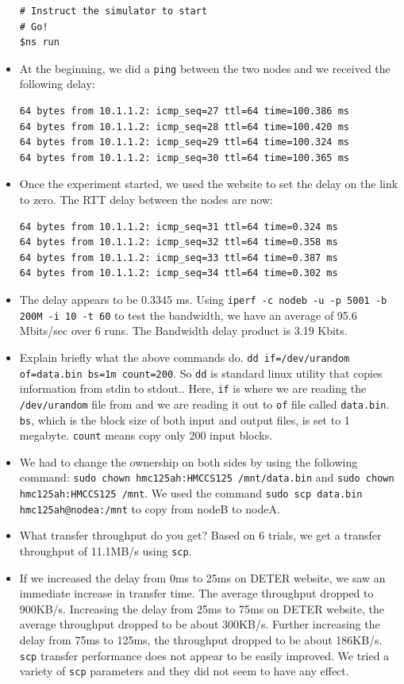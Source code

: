 \documentclass[10pt]{article}
\begin{document}
\begin{itemize}
\begin{lstlisting}
# Instruct the simulator to start
# Go!
$ns run
\end{lstlisting}
\item At the beginning, we did a \texttt{ping} between the two nodes and we received the following delay:
\begin{lstlisting}
64 bytes from 10.1.1.2: icmp_seq=27 ttl=64 time=100.386 ms
64 bytes from 10.1.1.2: icmp_seq=28 ttl=64 time=100.420 ms
64 bytes from 10.1.1.2: icmp_seq=29 ttl=64 time=100.324 ms
64 bytes from 10.1.1.2: icmp_seq=30 ttl=64 time=100.365 ms
\end{lstlisting}
\item Once the experiment started, we used the website to set the delay on the link to zero. The RTT delay between the nodes are now:
\begin{lstlisting}
64 bytes from 10.1.1.2: icmp_seq=31 ttl=64 time=0.324 ms
64 bytes from 10.1.1.2: icmp_seq=32 ttl=64 time=0.358 ms
64 bytes from 10.1.1.2: icmp_seq=33 ttl=64 time=0.387 ms
64 bytes from 10.1.1.2: icmp_seq=34 ttl=64 time=0.302 ms
\end{lstlisting}
\item The delay appears to be 0.3345 ms.  Using \texttt{iperf -c nodeb -u -p 5001 -b 200M -i 10 -t 60} to test the bandwidth, we have an average of 95.6 Mbits/sec over 6 runs. The Bandwidth delay product is 3.19 Kbits.
\item Explain briefly what the above commands do.  \texttt{dd if=/dev/urandom of=data.bin bs=1m count=200}.  So \texttt{dd} is standard linux utility that copies information from stdin to stdout..  Here, \texttt{if} is where we are reading the \texttt{/dev/urandom} file from and we are reading it out to \texttt{of} file called \texttt{data.bin}.  \texttt{bs}, which is the block size of both input and output files, is set to 1 megabyte. \texttt{count} means copy only 200 input blocks.
\item We had to change the ownership on both sides by using the following command: \texttt{sudo chown hmc125ah:HMCCS125 /mnt/data.bin} and \texttt{sudo chown hmc125ah:HMCCS125 /mnt}.  We used the command \texttt{sudo scp data.bin hmc125ah@nodea:/mnt} to copy from nodeB to nodeA.
\item What transfer throughput do you get?  Based on 6 trials, we get a transfer throughput of 11.1MB/s using \texttt{scp}.
\item If we increased the delay from 0ms to 25ms on DETER website, we saw an immediate increase in transfer time.  The average throughput dropped to 900KB/s.  Increasing the delay from 25ms to 75ms on DETER website, the average throughput dropped to be about 300KB/s.  Further increasing the delay from 75ms to 125ms, the throughput dropped to be about 186KB/s.  \texttt{scp} transfer performance does not appear to be easily improved.  We tried a variety of \texttt{scp} parameters and they did not seem to have any effect.

\end{itemize}
\end{document}
